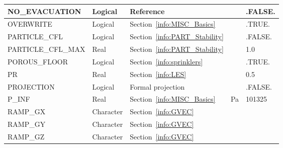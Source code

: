 \documentclass[11pt]{book}
\begin{document}
\begin{longtable}{@{\extracolsep{\fill}}|l|l|l|l|l|}
{\ct NO\_EVACUATION}                            & Logical       & Reference~\cite{FDS_Evac_Users_Guide}                 &               & {\ct .FALSE.}     \\ \hline
{\ct OVERWRITE}                                 & Logical       & Section~\ref{info:MISC_Basics}                        &               & {\ct .TRUE.}      \\ \hline
{\ct PARTICLE\_CFL}                             & Logical       & Section~\ref{info:PART_Stability}                     &               & {\ct .FALSE.}     \\ \hline
{\ct PARTICLE\_CFL\_MAX}                        & Real          & Section~\ref{info:PART_Stability}                     &               & 1.0               \\ \hline
{\ct POROUS\_FLOOR}                             & Logical       & Section~\ref{info:sprinklers}                         &               & {\ct .TRUE.}      \\ \hline
{\ct PR}                                        & Real          & Section~\ref{info:LES}                                &               & 0.5               \\ \hline
{\ct PROJECTION}                                & Logical       & Formal projection                                     &               & {\ct .FALSE.}     \\ \hline
{\ct P\_INF}                                    & Real          & Section~\ref{info:MISC_Basics}                        & Pa            & 101325            \\ \hline
{\ct RAMP\_GX}                                  & Character     & Section~\ref{info:GVEC}                               &               &                   \\ \hline
{\ct RAMP\_GY}                                  & Character     & Section~\ref{info:GVEC}                               &               &                   \\ \hline
{\ct RAMP\_GZ}                                  & Character     & Section~\ref{info:GVEC}                               &               &                   \\ \hline

\end{longtable}
\end{document}

